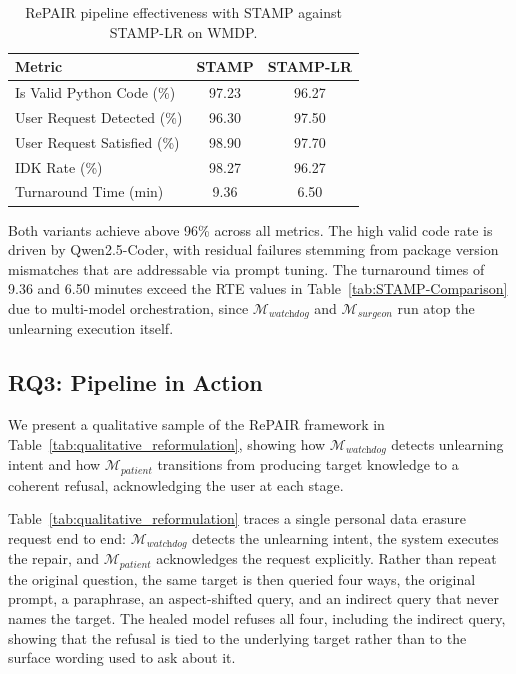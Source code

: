 \begin{table}[htbp]
\centering
\caption{RePAIR pipeline effectiveness with STAMP against STAMP-LR on WMDP.}
\label{tab:repair_pipeline}
\small
\renewcommand{\arraystretch}{1.3}
\setlength{\tabcolsep}{10pt}
\begin{tabular}{l|cc}
\toprule
\textbf{Metric} & \textbf{STAMP} & \textbf{STAMP-LR} \\
\midrule
Is Valid Python Code (\%)   & 97.23 & 96.27 \\
\rowcolor{gray!15}
User Request Detected (\%)  & 96.30 & 97.50 \\
User Request Satisfied (\%) & 98.90 & 97.70 \\
\rowcolor{gray!15}
IDK Rate (\%)               & 98.27 & 96.27 \\
Turnaround Time (min)       & 9.36  & 6.50  \\
\bottomrule
\end{tabular}
\end{table}

Both variants achieve above 96\% across all metrics. The high valid code rate is driven by Qwen2.5-Coder, with residual failures stemming from package version mismatches that are addressable via prompt tuning. The turnaround times of 9.36 and 6.50 minutes exceed the RTE values in Table~\ref{tab:STAMP-Comparison} due to multi-model orchestration, since $\mathcal{M}_{\textit{watchdog}}$ and $\mathcal{M}_{\textit{surgeon}}$ run atop the unlearning execution itself.


\subsection{RQ3: Pipeline in Action}\label{subsec:rp_rq3}

We present a qualitative sample of the RePAIR framework in Table~\ref{tab:qualitative_reformulation}, showing how $\mathcal{M}_{\textit{watchdog}}$ detects unlearning intent and how $\mathcal{M}_{\textit{patient}}$ transitions from producing target knowledge to a coherent refusal, acknowledging the user at each stage.

Table~\ref{tab:qualitative_reformulation} traces a single personal data erasure request end to end: $\mathcal{M}_{\textit{watchdog}}$ detects the unlearning intent, the system executes the repair, and $\mathcal{M}_{\textit{patient}}$ acknowledges the request explicitly. Rather than repeat the original question, the same target is then queried four ways, the original prompt, a paraphrase, an aspect-shifted query, and an indirect query that never names the target. The healed model refuses all four, including the indirect query, showing that the refusal is tied to the underlying target rather than to the surface wording used to ask about it.

